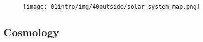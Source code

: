 \begin{figure}[H]
    \centering \texttt{[image: 01intro/img/40outside/solar\_system\_map.png]}
\end{figure}
\subsection*{Cosmology}
\begin{linenumbers}
\newpage~
\end{linenumbers}
